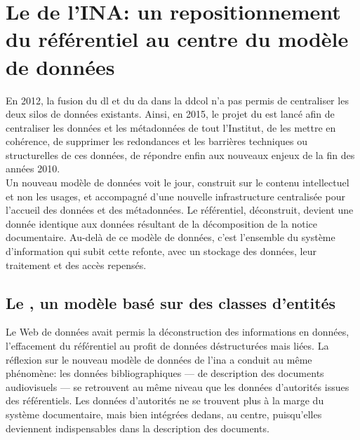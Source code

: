 \section[Le \textit{Lac de données} de l'INA]{\label{III-B-2}Le \ldd de l'INA: un repositionnement du référentiel au centre du modèle de données}

 En 2012, la fusion du \ac{dl} et du \ac{da} dans la \ac{ddcol} n'a pas permis de centraliser les deux silos de données existants. Ainsi, en 2015, le projet du \ldd est lancé afin de centraliser les données et les métadonnées de tout l'Institut, de les mettre en cohérence, de supprimer les redondances et les barrières techniques ou structurelles de ces données, de répondre enfin aux nouveaux enjeux de la fin des années 2010.\\

Un nouveau modèle de données voit le jour, construit sur le contenu intellectuel et non les usages, et accompagné d'une nouvelle infrastructure centralisée pour l'accueil des données et des métadonnées. Le référentiel, déconstruit, devient une donnée identique aux données résultant de la décomposition de la notice documentaire. Au-delà de ce modèle de données, c'est l'ensemble du système d'information qui subit cette refonte, avec un stockage des données, leur traitement et des accès repensés.

\subsection{\label{III-B-2-a}Le \ldd, un modèle basé sur des classes d'entités}

Le Web de données avait permis la déconstruction des informations en données, l'effacement du référentiel au profit de données déstructurées mais liées. La réflexion sur le nouveau modèle de données de l'\ac{ina} a conduit au même phénomène: les données bibliographiques --- de description des documents audiovisuels --- se retrouvent au même niveau que les données d'autorités issues des référentiels. Les données d'autorités ne se trouvent plus à la marge du système documentaire, mais bien intégrées dedans, au centre, puisqu'elles deviennent indispensables dans la description des documents.\\

